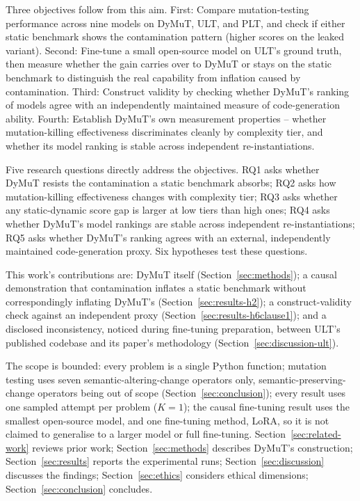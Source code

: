 Three objectives follow from this aim. First: Compare mutation-testing performance across nine models on DyMuT, ULT, and PLT, and check if either static benchmark shows the contamination pattern (higher scores on the leaked variant). Second: Fine-tune a small open-source model on ULT's ground truth, then measure whether the gain carries over to DyMuT or stays on the static benchmark to distinguish the real capability from inflation caused by contamination. Third: Construct validity by checking whether DyMuT's ranking of models agree with an independently maintained measure of code-generation ability. Fourth: Establish DyMuT's own measurement properties -- whether mutation-killing effectiveness discriminates cleanly by complexity tier, and whether its model ranking is stable across independent re-instantiations.

Five research questions directly address the objectives. RQ1 asks whether DyMuT resists the contamination a static benchmark absorbs; RQ2 asks how mutation-killing effectiveness changes with complexity tier; RQ3 asks whether any static-dynamic score gap is larger at low tiers than high ones; RQ4 asks whether DyMuT's model rankings are stable across independent re-instantiations; RQ5 asks whether DyMuT's ranking agrees with an external, independently maintained code-generation proxy. Six hypotheses test these questions.

This work's contributions are: DyMuT itself (Section~\ref{sec:methods}); a causal demonstration that contamination inflates a static benchmark without correspondingly inflating DyMuT's (Section~\ref{sec:results-h2}); a construct-validity check against an independent proxy (Section~\ref{sec:results-h6clause1}); and a disclosed inconsistency, noticed during fine-tuning preparation, between ULT's published codebase and its paper's methodology (Section~\ref{sec:discussion-ult}).

The scope is bounded: every problem is a single Python function; mutation testing uses seven semantic-altering-change operators only, semantic-preserving-change operators being out of scope (Section~\ref{sec:conclusion}); every result uses one sampled attempt per problem ($K=1$); the causal fine-tuning result uses the smallest open-source model, and one fine-tuning method, LoRA, so it is not claimed to generalise to a larger model or full fine-tuning. Section~\ref{sec:related-work} reviews prior work; Section~\ref{sec:methods} describes DyMuT's construction; Section~\ref{sec:results} reports the experimental runs; Section~\ref{sec:discussion} discusses the findings; Section~\ref{sec:ethics} considers ethical dimensions; Section~\ref{sec:conclusion} concludes.


